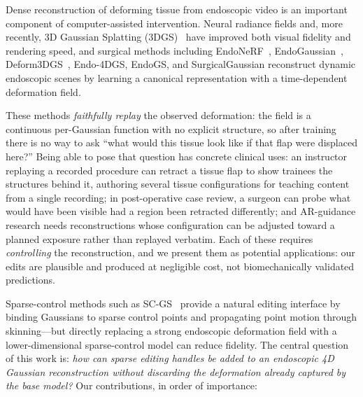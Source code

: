 \documentclass[ASNA,twocolumn]{USG} %
\begin{document}
Dense reconstruction of deforming tissue from endoscopic video is an important component of computer-assisted intervention. Neural radiance fields and, more recently, 3D Gaussian Splatting (3DGS)~\cite{kerbl2023gaussian} have improved both visual fidelity and rendering speed, and surgical methods including EndoNeRF~\cite{wang2022endonerf}, EndoGaussian~\cite{liu2024endogaussian}, Deform3DGS~\cite{yang2024deform3dgs}, Endo-4DGS, EndoGS, and SurgicalGaussian reconstruct dynamic endoscopic scenes by learning a canonical representation with a time-dependent deformation field.

These methods \emph{faithfully replay} the observed deformation: the field is a continuous per-Gaussian function with no explicit structure, so after training there is no way to ask ``what would this tissue look like if that flap were displaced here?'' Being able to pose that question has concrete clinical uses: an instructor replaying a recorded procedure can retract a tissue flap to show trainees the structures behind it, authoring several tissue configurations for teaching content from a single recording; in post-operative case review, a surgeon can probe what would have been visible had a region been retracted differently; and AR-guidance research needs reconstructions whose configuration can be adjusted toward a planned exposure rather than replayed verbatim. Each of these requires \emph{controlling} the reconstruction, and we present them as potential applications: our edits are plausible and produced at negligible cost, not biomechanically validated predictions.

Sparse-control methods such as SC-GS~\cite{huang2024scgs} provide a natural editing interface by binding Gaussians to sparse control points and propagating point motion through skinning---but directly replacing a strong endoscopic deformation field with a lower-dimensional sparse-control model can reduce fidelity. The central question of this work is: \emph{how can sparse editing handles be added to an endoscopic 4D Gaussian reconstruction without discarding the deformation already captured by the base model?} Our contributions, in order of importance:
\end{document}
